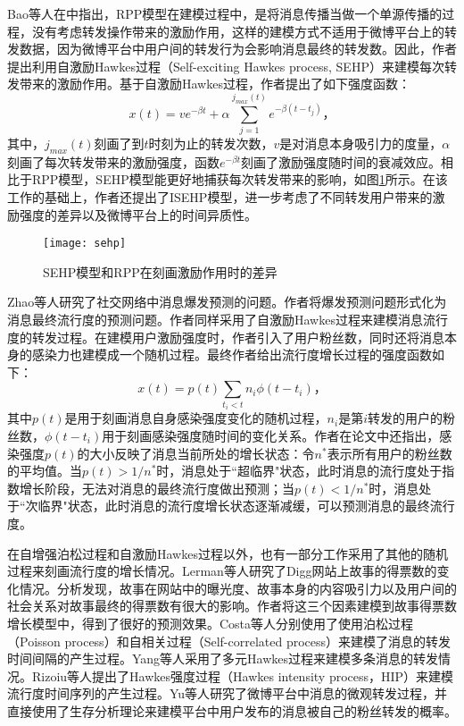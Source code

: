 Bao等人在\citep{bao2015modeling}中指出，RPP模型在建模过程中，是将消息传播当做一个单源传播的过程，没有考虑转发操作带来的激励作用，这样的建模方式不适用于微博平台上的转发数据，因为微博平台中用户间的转发行为会影响消息最终的转发数。因此，作者提出利用自激励Hawkes过程（Self-exciting Hawkes process, SEHP）\citep{hawkes1974cluster}来建模每次转发带来的激励作用。基于自激励Hawkes过程，作者提出了如下强度函数：
\begin{equation}
\label{eq:hawkesIntensity}
x(t)=v e^{-\beta t}+\alpha \sum_{j=1}^{j_{max}(t)} e^{-\beta(t-t_j)}\text{，}
\end{equation}
其中，$j_{max}(t)$刻画了到$t$时刻为止的转发次数，$v$是对消息本身吸引力的度量，$\alpha$刻画了每次转发带来的激励强度，函数$e^{-\beta t}$刻画了激励强度随时间的衰减效应。相比于RPP模型，SEHP模型能更好地捕获每次转发带来的影响，如图\ref{fig:sehp}所示。在该工作的基础上，作者还提出了ISEHP模型\citep{bao2016modeling}，进一步考虑了不同转发用户带来的激励强度的差异以及微博平台上的时间异质性。
\begin{figure}[!htbp]
  \centering
  \texttt{[image: sehp]}
  \caption{SEHP模型和RPP在刻画激励作用时的差异\citep{bao2015modeling}}
  \label{fig:sehp}
\end{figure}

Zhao等人\citep{zhao2015seismic}研究了社交网络中消息爆发预测的问题。作者将爆发预测问题形式化为消息最终流行度的预测问题。作者同样采用了自激励Hawkes过程来建模消息流行度的转发过程。在建模用户激励强度时，作者引入了用户粉丝数，同时还将消息本身的感染力也建模成一个随机过程。最终作者给出流行度增长过程的强度函数如下：
\begin{equation}
\label{eq:seismic}
x(t)=p(t) \sum_{t_i<t}n_i \phi(t-t_i)\text{，}
\end{equation}
其中$p(t)$是用于刻画消息自身感染强度变化的随机过程，$n_i$是第$i$转发的用户的粉丝数，$\phi(t-t_i)$用于刻画感染强度随时间的变化关系。作者在论文中还指出，感染强度$p(t)$的大小反映了消息当前所处的增长状态：令$n^{\ast}$表示所有用户的粉丝数的平均值。当$p(t)>1/n^{\ast}$时，消息处于``超临界"状态，此时消息的流行度处于指数增长阶段，无法对消息的最终流行度做出预测；当$p(t)<1/n^{\ast}$时，消息处于``次临界"状态，此时消息的流行度增长状态逐渐减缓，可以预测消息的最终流行度。

在自增强泊松过程和自激励Hawkes过程以外，也有一部分工作采用了其他的随机过程来刻画流行度的增长情况。Lerman等人\citep{lerman2010using}研究了Digg网站上故事的得票数的变化情况。分析发现，故事在网站中的曝光度、故事本身的内容吸引力以及用户间的社会关系对故事最终的得票数有很大的影响。作者将这三个因素建模到故事得票数增长模型中，得到了很好的预测效果。Costa等人\citep{ferraz2015rsc}分别使用了使用泊松过程（Poisson process）\citep{kingman1993poisson}和自相关过程（Self-correlated process）来建模了消息的转发时间间隔的产生过程。Yang等人\citep{yang2013mixture}采用了多元Hawkes过程来建模多条消息的转发情况。Rizoiu等人\citep{rizoiu2017expecting}提出了Hawkes强度过程（Hawkes intensity process，HIP）来建模流行度时间序列的产生过程。Yu等人\citep{yu2015micro}研究了微博平台中消息的微观转发过程，并直接使用了生存分析理论来建模平台中用户发布的消息被自己的粉丝转发的概率。

